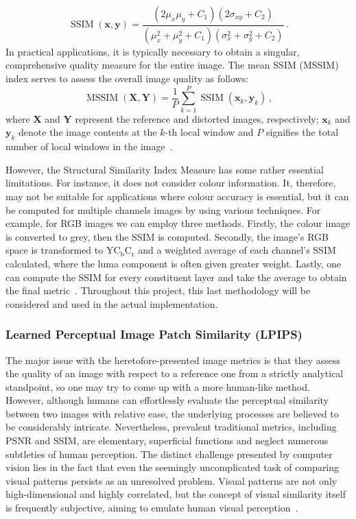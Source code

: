 \begin{equation}
    \operatorname{SSIM}(\symbf{x}, \symbf{y}) = \dfrac{\left( 2 \mu_x \mu_y + C_1 \right) \left( 2 \sigma_{xy} + C_2 \right)}{\left( \mu_x^2 + \mu_y^2 + C_1 \right) \left( \sigma_x^2 + \sigma_y^2 + C_2 \right)}\,.
\end{equation}
In practical applications, it is typically necessary to obtain a singular, comprehensive quality measure for the entire image. The mean SSIM (MSSIM) index serves to assess the overall image quality as follows:
\begin{equation}
    \operatorname{MSSIM}(\symbf{X}, \symbf{Y}) = \dfrac{1}{P} \sum\limits_{k=1}^P \operatorname{SSIM}(\symbf{x}_k, \symbf{y}_k)\,,
\end{equation}
where $\symbf{X}$ and $\symbf{Y}$ represent the reference and distorted images, respectively; $\symbf{x}_k$ and $\symbf{y}_k$ denote the image contents at the $k$-th local window and $P$ signifies the total number of local windows in the image~\supercite{ssim}.

However, the Structural Similarity Index Measure has some rather essential limitations. For instance, it does not consider colour information. It, therefore, may not be suitable for applications where colour accuracy is essential, but it can be computed for multiple channels images by using various techniques. For example, for RGB images we can employ three methods. Firstly, the colour image is converted to grey, then the SSIM is computed. Secondly, the image's RGB space is transformed to $\mathrm{Y}\mathrm{C}_\mathrm{b}\mathrm{C}_\mathrm{r}$ and a weighted average of each channel's SSIM calculated, where the luma component is often given greater weight. Lastly, one can compute the SSIM for every constituent layer and take the average to obtain the final metric~\supercite{ssim2}. Throughout this project, this last methodology will be considered and used in the actual implementation.



\subsubsection*{Learned Perceptual Image Patch Similarity (LPIPS)}

The major issue with the heretofore-presented image metrics is that they assess the quality of an image with respect to a reference one from a strictly analytical standpoint, so one may try to come up with a more human-like method. However, although humans can effortlessly evaluate the perceptual similarity between two images with relative ease, the underlying processes are believed to be considerably intricate. Nevertheless, prevalent traditional metrics, including PSNR and SSIM, are elementary, superficial functions and neglect numerous subtleties of human perception. The distinct challenge presented by computer vision lies in the fact that even the seemingly uncomplicated task of comparing visual patterns persists as an unresolved problem. Visual patterns are not only high-dimensional and highly correlated, but the concept of visual similarity itself is frequently subjective, aiming to emulate human visual perception~\supercite{lpips}.

